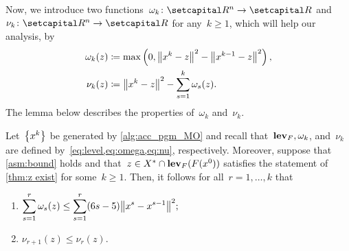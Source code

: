 \documentclass[../main]{subfiles}
\begin{document}
Now, we introduce two functions~$\omega_k \colon \setR^n \to \setR$ and~$\nu_k \colon \setR^n \to \setR$ for any~$k \ge 1$, which will help our analysis, by
\begin{align}
    \omega_k(z) &\coloneqq \max \left( 0, \norm*{x^k - z}^2 - \norm*{x^{k - 1} - z}^2 \right) \label{eq:omega}, \\
    \nu_k(z) &\coloneqq \norm*{x^k - z}^2 - \sum_{s = 1}^{k} \omega_s(z) \label{eq:nu}
.\end{align}
The lemma below describes the properties of~$\omega_k$ and~$\nu_k$.
\begin{lemma} \label{thm:omega nu}
    Let~$\set*{x^k}$ be generated by \cref{alg:acc_pgm_MO} and recall that~$\level_F, \omega_k$, and~$\nu_k$ are defined by~\cref{eq:level,eq:omega,eq:nu}, respectively.
    Moreover, suppose that \cref{asm:bound} holds and that~$z \in X^\ast \cap \level_F(F(x^0))$ satisfies the statement of \cref{thm:z exist} for some~$k \ge 1$.
    Then, it follows for all~$r = 1, \dots, k$ that
    \begin{enumerate}
        \item $\displaystyle \sum_{s = 1}^{r} \omega_s(z) \le \sum_{s = 1}^{r}(6s - 5) \norm*{x^s - x^{s - 1}}^2;$ \label{thm:omega nu:omega}
        \item $\displaystyle \nu_{r + 1}(z) \le \nu_r(z).$ \label{thm:omega nu:nu}
    \end{enumerate}
\end{lemma}
\end{document}

